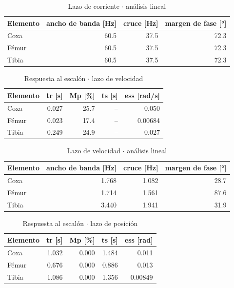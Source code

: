 \begin{table}[htbp]
\centering
\caption{Lazo de corriente $\cdot$ análisis lineal}
\begin{tabular}{lrrr}
\toprule
Elemento & ancho de banda [Hz] & cruce [Hz] & margen de fase [°] \\
\midrule
Coxa & 60.5 & 37.5 & 72.3 \\
Fémur & 60.5 & 37.5 & 72.3 \\
Tibia & 60.5 & 37.5 & 72.3 \\
\bottomrule
\end{tabular}
\end{table}

\begin{table}[htbp]
\centering
\caption{Respuesta al escalón $\cdot$ lazo de velocidad}
\begin{tabular}{lrrrr}
\toprule
Elemento & tr [s] & Mp [\%] & ts [s] & ess [rad/s] \\
\midrule
Coxa & 0.027 & 25.7 & -- & 0.050 \\
Fémur & 0.023 & 17.4 & -- & 0.00684 \\
Tibia & 0.249 & 24.9 & -- & 0.027 \\
\bottomrule
\end{tabular}
\end{table}

\begin{table}[htbp]
\centering
\caption{Lazo de velocidad $\cdot$ análisis lineal}
\begin{tabular}{lrrr}
\toprule
Elemento & ancho de banda [Hz] & cruce [Hz] & margen de fase [°] \\
\midrule
Coxa & 1.768 & 1.082 & 28.7 \\
Fémur & 1.714 & 1.561 & 87.6 \\
Tibia & 3.440 & 1.941 & 31.9 \\
\bottomrule
\end{tabular}
\end{table}

\begin{table}[htbp]
\centering
\caption{Respuesta al escalón $\cdot$ lazo de posición}
\begin{tabular}{lrrrr}
\toprule
Elemento & tr [s] & Mp [\%] & ts [s] & ess [rad] \\
\midrule
Coxa & 1.032 & 0.000 & 1.484 & 0.011 \\
Fémur & 0.676 & 0.000 & 0.886 & 0.013 \\
Tibia & 1.086 & 0.000 & 1.356 & 0.00849 \\
\bottomrule
\end{tabular}
\end{table}

